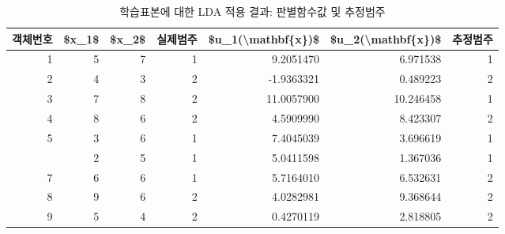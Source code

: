 \documentclass[
]{book}
\newenvironment{Shaded}{\begin{snugshade}}{\end{snugshade}}
\newcommand{\AttributeTok}[1]{\textcolor[rgb]{0.77,0.63,0.00}{#1}}
\newcommand{\ConstantTok}[1]{\textcolor[rgb]{0.00,0.00,0.00}{#1}}
\newcommand{\DecValTok}[1]{\textcolor[rgb]{0.00,0.00,0.81}{#1}}
\newcommand{\FunctionTok}[1]{\textcolor[rgb]{0.00,0.00,0.00}{#1}}
\newcommand{\NormalTok}[1]{#1}
\newcommand{\SpecialCharTok}[1]{\textcolor[rgb]{0.00,0.00,0.00}{#1}}
\newcommand{\StringTok}[1]{\textcolor[rgb]{0.31,0.60,0.02}{#1}}
\begin{document}
\begin{Shaded}
\end{Shaded}

\begin{table}

\caption{\label{tab:lda-disriminant-result}학습표본에 대한 LDA 적용 결과: 판별함수값 및 추정범주}
\centering
\begin{tabular}[t]{rrrrrrr}
\toprule
객체번호 & \$x\_1\$ & \$x\_2\$ & 실제범주 & \$u\_1(\textbackslash{}mathbf\{x\})\$ & \$u\_2(\textbackslash{}mathbf\{x\})\$ & 추정범주\\
\midrule
1 & 5 & 7 & 1 & 9.2051470 & 6.971538 & 1\\
2 & 4 & 3 & 2 & -1.9363321 & 0.489223 & 2\\
3 & 7 & 8 & 2 & 11.0057900 & 10.246458 & 1\\
4 & 8 & 6 & 2 & 4.5909990 & 8.423307 & 2\\
5 & 3 & 6 & 1 & 7.4045039 & 3.696619 & 1\\
\addlinespace
6 & 2 & 5 & 1 & 5.0411598 & 1.367036 & 1\\
7 & 6 & 6 & 1 & 5.7164010 & 6.532631 & 2\\
8 & 9 & 6 & 2 & 4.0282981 & 9.368644 & 2\\
9 & 5 & 4 & 2 & 0.4270119 & 2.818805 & 2\\
\bottomrule
\end{tabular}
\end{table}
\end{document}
